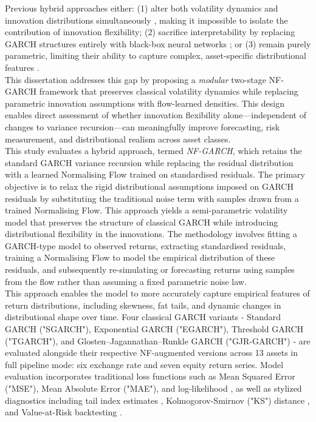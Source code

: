 \documentclass[oneside,12pt]{CUEDthesisPSnPDF}
\newcommand{\parencite}{\citep}
\begin{document}
Previous hybrid approaches either: (1) alter both volatility dynamics and innovation distributions simultaneously \parencite{seitz2022garchnf}, making it impossible to isolate the contribution of innovation flexibility; (2) sacrifice interpretability by replacing GARCH structures entirely with black-box neural networks \parencite{bao2017deep}; or (3) remain purely parametric, limiting their ability to capture complex, asset-specific distributional features \parencite{hansen1994autoregressive}.\\

This dissertation addresses this gap by proposing a \emph{modular} two-stage NF-GARCH framework that preserves classical volatility dynamics while replacing parametric innovation assumptions with flow-learned densities. This design enables direct assessment of whether innovation flexibility alone—independent of changes to variance recursion—can meaningfully improve forecasting, risk measurement, and distributional realism across asset classes.\\

This study evaluates a hybrid approach, termed \emph{NF-GARCH}, which retains the standard GARCH variance recursion while replacing the residual distribution with a learned Normalising Flow trained on standardised residuals. The primary objective is to relax the rigid distributional assumptions imposed on GARCH residuals by substituting the traditional noise term with samples drawn from a trained Normalising Flow. This approach yields a semi-parametric volatility model that preserves the structure of classical GARCH while introducing distributional flexibility in the innovations. The methodology involves fitting a GARCH-type model to observed returns, extracting standardised residuals, training a Normalising Flow to model the empirical distribution of these residuals, and subsequently re-simulating or forecasting returns using samples from the flow rather than assuming a fixed parametric noise law.\\ 

This approach enables the model to more accurately capture empirical features of return distributions, including skewness, fat tails, and dynamic changes in distributional shape over time. Four classical GARCH variants - Standard GARCH ("SGARCH"), Exponential GARCH ("EGARCH"), Threshold GARCH ("TGARCH"), and Glosten–Jagannathan–Runkle GARCH ("GJR-GARCH") - are evaluated alongside their respective NF-augmented versions across 13 assets in full pipeline mode: six exchange rate and seven equity return series. Model evaluation incorporates traditional loss functions such as Mean Squared Error ("MSE"), Mean Absolute Error ("MAE"), and log-likelihood \parencite{amisano2007comparing}, as well as stylized diagnostics including tail index estimates \parencite{hill1975simple}, Kolmogorov-Smirnov ("KS") distance \parencite{theis2015note}, and Value-at-Risk backtesting \parencite{kupiec1995techniques, christoffersen1998evaluating}.\\
\end{document}
